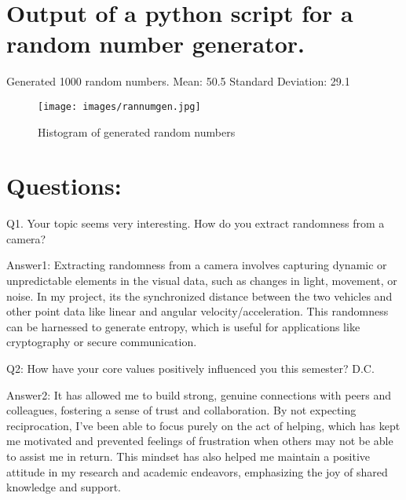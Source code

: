 \documentclass{article}
\begin{document}
\section{Output of a python script for a random number generator.}
Generated 1000 random numbers.
Mean: 50.5
Standard Deviation: 29.1
\begin{figure}[ht]
    \centering
    \texttt{[image: images/rannumgen.jpg]}
    \caption{Histogram of generated random numbers}
    \label{fig: rannumgen.jpg}
\end{figure}


\section*{Questions: }

Q1. Your topic seems very interesting. How do you extract randomness from a camera?

Answer1: Extracting randomness from a camera involves capturing dynamic or unpredictable elements in the visual data, such as changes in light, movement, or noise. In my project, its the synchronized distance between the two vehicles and other point data like linear and angular velocity/acceleration. This randomness can be harnessed to generate entropy, which is useful for applications like cryptography or secure communication.

Q2: How have your core values positively influenced you this semester? D.C.

Answer2: It has allowed me to build strong, genuine connections with peers and colleagues, fostering a sense of trust and collaboration. By not expecting reciprocation, I’ve been able to focus purely on the act of helping, which has kept me motivated and prevented feelings of frustration when others may not be able to assist me in return. This mindset has also helped me maintain a positive attitude in my research and academic endeavors, emphasizing the joy of shared knowledge and support.
\end{document}
